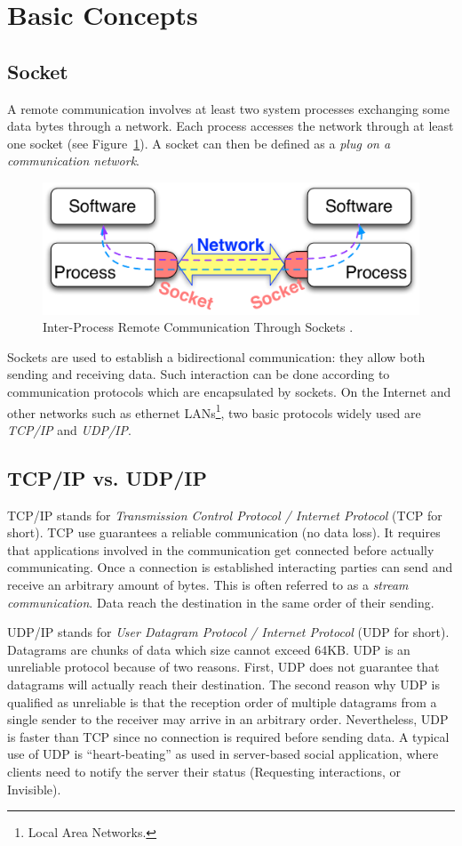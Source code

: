 \documentclass[a4paper,10pt,twoside]{book}
\begin{document}
\section{Basic Concepts}
\subsection{Socket}
A remote communication involves at least two system processes exchanging some data bytes through a network. Each process accesses the network through at least one socket (see Figure~\ref{fig:socketConcept}).
A socket can then be defined as a \textit{plug on a communication network}.

\begin{figure}[ht]\centering
	\includegraphics[width=.75\linewidth]{socketConcept}
	\caption{Inter-Process Remote Communication Through Sockets .}
	\label{fig:socketConcept}
\end{figure}

Sockets are used to establish a bidirectional communication: they allow both sending and receiving data. 
Such interaction can be done according to communication protocols which are encapsulated by sockets. On the Internet and other networks such as ethernet LANs\footnote{Local Area Networks.}, two basic protocols widely used are \textit{TCP/IP} and \textit{UDP/IP}.

\subsection{TCP/IP vs. UDP/IP}
TCP/IP stands for \textit{Transmission Control Protocol / Internet Protocol} (TCP for short).
TCP use guarantees a reliable communication (no data loss). It requires that applications involved in the communication get connected before actually communicating. 
Once a connection is established interacting parties can send and receive an arbitrary amount of bytes. This is often referred to as a \textit{stream communication}.
Data reach the destination in the same order of their sending.

UDP/IP stands for \textit{User Datagram Protocol / Internet Protocol} (UDP for short).
Datagrams are chunks of data which size cannot exceed 64KB. UDP is an unreliable protocol because of two reasons. First, UDP does not guarantee that  datagrams will actually reach their destination.
The second reason why UDP is qualified as unreliable is that the reception order of multiple datagrams from a single sender to the receiver may arrive in an arbitrary order.
Nevertheless, UDP is faster than TCP since no connection is required before sending data.
A typical use of UDP is  ``heart-beating'' as used in server-based social application, where clients need to notify the server their status (\eg Requesting interactions, or Invisible).
\end{document}

